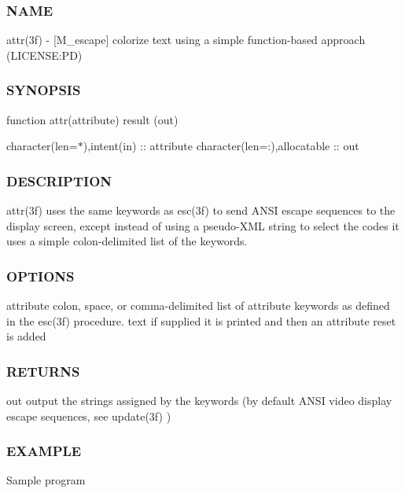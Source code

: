 \subsubsection*{N\+A\+ME}

attr(3f) -\/ \mbox{[}M\+\_\+escape\mbox{]} colorize text using a simple function-\/based approach (L\+I\+C\+E\+N\+SE\+:PD) 

\subsubsection*{S\+Y\+N\+O\+P\+S\+IS}

function attr(attribute) result (out)

character(len=$\ast$),intent(in) \+:\+: attribute character(len=\+:),allocatable \+:\+: out

\subsubsection*{D\+E\+S\+C\+R\+I\+P\+T\+I\+ON}

attr(3f) uses the same keywords as esc(3f) to send A\+N\+SI escape sequences to the display screen, except instead of using a pseudo-\/\+X\+ML string to select the codes it uses a simple colon-\/delimited list of the keywords.

\subsubsection*{O\+P\+T\+I\+O\+NS}

attribute colon, space, or comma-\/delimited list of attribute keywords as defined in the esc(3f) procedure. text if supplied it is printed and then an attribute reset is added

\subsubsection*{R\+E\+T\+U\+R\+NS}

out output the strings assigned by the keywords (by default A\+N\+SI video display escape sequences, see update(3f) ) \subsubsection*{E\+X\+A\+M\+P\+LE}

Sample program

